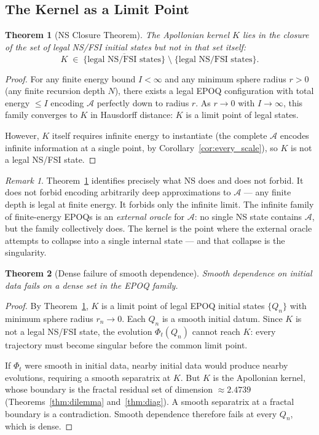\documentclass[11pt]{article}
\theoremstyle{plain}
\newtheorem{theorem}{Theorem}
\theoremstyle{definition}
\theoremstyle{remark}
\newtheorem{remark}{Remark}
\begin{document}
\subsection{The Kernel as a Limit Point}

\begin{theorem}[NS Closure Theorem]
\label{thm:closure}
The Apollonian kernel $K$ lies in the closure of the set of legal NS/FSI
initial states but not in that set itself:
\[
  K \;\in\;
  \overline{\{\text{legal NS/FSI states}\}}
  \;\setminus\;
  \{\text{legal NS/FSI states}\}.
\]
\end{theorem}

\begin{proof}
For any finite energy bound $I < \infty$ and any minimum sphere radius
$r > 0$ (any finite recursion depth $N$), there exists a legal EPOQ
configuration with total energy $\leq I$ encoding $\mathcal{A}$ perfectly
down to radius $r$. As $r \to 0$ with $I \to \infty$, this family converges
to $K$ in Hausdorff distance: $K$ is a limit point of legal states.

However, $K$ itself requires infinite energy to instantiate (the complete
$\mathcal{A}$ encodes infinite information at a single point, by
Corollary~\ref{cor:every_scale}), so $K$ is not a legal NS/FSI state.
\end{proof}

\begin{remark}
Theorem~\ref{thm:closure} identifies precisely what NS does and does not
forbid. It does not forbid encoding arbitrarily deep approximations to
$\mathcal{A}$ --- any finite depth is legal at finite energy. It forbids
only the infinite limit. The infinite family of finite-energy EPOQs is an
\emph{external oracle} for $\mathcal{A}$: no single NS state contains
$\mathcal{A}$, but the family collectively does. The kernel is the point
where the external oracle attempts to collapse into a single internal state
--- and that collapse is the singularity.
\end{remark}

\begin{theorem}[Dense failure of smooth dependence]
\label{thm:dense}
Smooth dependence on initial data fails on a dense set in the EPOQ family.
\end{theorem}

\begin{proof}
By Theorem~\ref{thm:closure}, $K$ is a limit point of legal EPOQ initial
states $\{Q_n\}$ with minimum sphere radius $r_n \to 0$. Each $Q_n$ is a
smooth initial datum. Since $K$ is not a legal NS/FSI state, the evolution
$\Phi_t(Q_n)$ cannot reach $K$: every trajectory must become singular before
the common limit point.

If $\Phi_t$ were smooth in initial data, nearby initial data would produce
nearby evolutions, requiring a smooth separatrix at $K$. But $K$ is the
Apollonian kernel, whose boundary is the fractal residual set of dimension
$\approx 2.4739$ (Theorems~\ref{thm:dilemma} and~\ref{thm:diag}). A smooth
separatrix at a fractal boundary is a contradiction. Smooth dependence
therefore fails at every $Q_n$, which is dense.
\end{proof}
\end{document}
